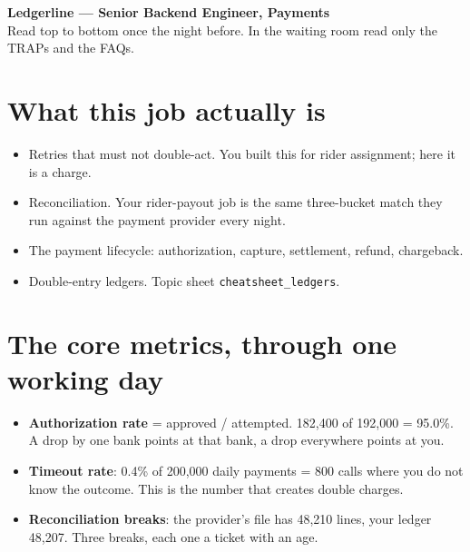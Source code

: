 \documentclass[10pt,a4paper]{article}
\begin{document}
\begin{center}{\LARGE\bfseries Ledgerline — Senior Backend Engineer, Payments}\\[2pt]
Read top to bottom once the night before. In the waiting room read only the TRAPs and the FAQs.\end{center}

\section{What this job actually is}
\begin{itemize}
  \item \K Retries that must not double-act. You built this for rider assignment; here it is a charge.
  \item \K Reconciliation. Your rider-payout job is the same three-bucket match they run against the payment provider every night.
  \item \LRN The payment lifecycle: authorization, capture, settlement, refund, chargeback.
  \item \LRN Double-entry ledgers. Topic sheet \texttt{cheatsheet\_ledgers}.
\end{itemize}

\section{The core metrics, through one working day}
\begin{itemize}
  \item \textbf{Authorization rate} = approved / attempted. 182,400 of 192,000 = 95.0\%. A drop by one bank points at that bank, a drop everywhere points at you.
  \item \textbf{Timeout rate}: 0.4\% of 200,000 daily payments = 800 calls where you do not know the outcome. This is the number that creates double charges.
  \item \textbf{Reconciliation breaks}: the provider's file has 48,210 lines, your ledger 48,207. Three breaks, each one a ticket with an age.
\end{itemize}
\end{document}
